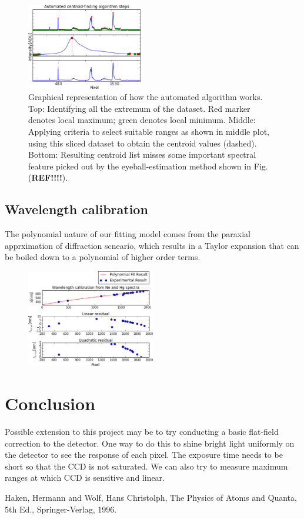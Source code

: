 \documentclass[authoryear, 12pt,5p, times]{elsarticle}
\begin{document}
\begin{figure}
\includegraphics[width=0.45\textwidth]{figures/steps}
\caption{Graphical representation of how the automated algorithm works. Top: Identifying all the extremum of the dataset. Red marker denotes local maximum; green denotes local minimum. Middle: Applying criteria to select suitable ranges as shown in middle plot, using this sliced dataset to obtain the centroid values (dashed). Bottom: Resulting centroid list misses some important spectral feature picked out by the eyeball-estimation method shown in Fig. (\textbf{REF!!!!}).} 
\end{figure}
\subsection{Wavelength calibration}
The polynomial nature of our fitting model comes from the paraxial apprximation of diffraction scneario, which results in a Taylor expansion that can be boiled down to a polynomial of higher order terms.
\begin{figure}
\includegraphics[width=0.5\textwidth]{figures/neon_calib}
\caption{ } 
\end{figure}
\section{Conclusion}
Possible extension to this project may be to try conducting a basic flat-field correction to the detector. One way to do this to shine bright light uniformly on the detector to see the response of each pixel. The exposure time needs to be short so that the CCD is not saturated. We can also try to measure maximum ranges at which CCD is sensitive and linear.

%
%
%

Haken, Hermann and Wolf, Hans Christolph, The Physics of Atoms and Quanta, 5th Ed., Springer-Verlag, 1996.
\end{document}
